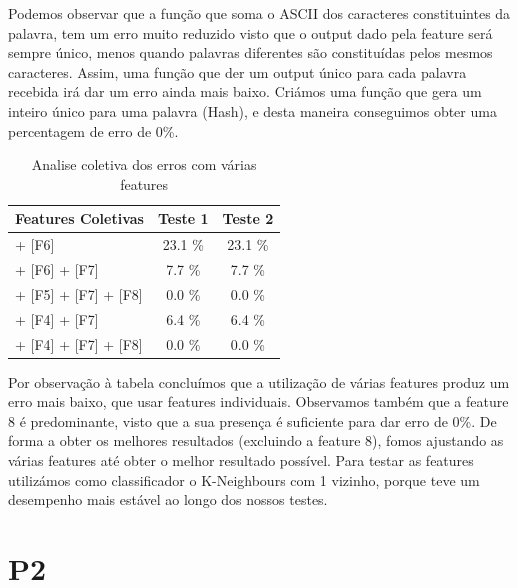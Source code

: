\documentclass[11pt,twocolumn]{article}
\begin{document}
    Podemos observar que a função que soma o ASCII dos caracteres
    constituintes da palavra, tem um erro muito reduzido visto que o output dado pela feature será sempre único, menos quando palavras diferentes são constituídas pelos mesmos caracteres. 
    Assim, uma função que der um output único para cada palavra recebida irá dar um erro ainda mais baixo. Criámos uma função que gera um inteiro único para uma palavra (Hash), e desta maneira conseguimos obter uma percentagem de erro de 0\%.
    
    \begin{table}[htbp]
        \centering
        \caption{Analise coletiva dos erros com várias features}
        \label{my-label}
        \begin{tabular}{|l|c|c|}
        \hline
        \multicolumn{1}{|c|}{Features Coletivas}         & \textbf{Teste 1} & \textbf{Teste 2}                    \\ \hline
        [F5] + [F6] & 23.1 \% & 23.1 \% \\ \hline
        [F5] + [F6] + [F7]     & 7.7 \%  & 7.7 \%                   \\ \hline
        [F4] + [F5] + [F7] + [F8]   & 0.0 \%              & 0.0 \%                                 \\ \hline
        [F3] + [F4] + [F7]   & 6.4 \%             & 6.4 \%                                 \\ \hline
        [F3] + [F4] + [F7] + [F8]   & 0.0 \%          & 0.0 \%                                 \\ \hline
        \end{tabular}
        \end{table}
    \par  
    Por observação à tabela concluímos que a utilização de várias features produz um erro mais baixo, que usar features individuais. 
    Observamos também que a feature 8 é predominante, visto que a sua presença é suficiente para dar erro de 0\%. De forma a obter os melhores resultados (excluindo a feature 8), fomos ajustando as várias features até obter o melhor resultado possível. Para testar as features utilizámos 
    como classificador o K-Neighbours com 1 vizinho, porque teve um desempenho mais estável ao longo dos nossos testes.

\section*{P2}
\end{document}
